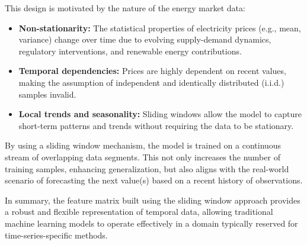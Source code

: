 \documentclass[a4paper,11pt]{article}
\begin{document}
This design is motivated by the nature of the energy market data:

\begin{itemize}
    \item \textbf{Non-stationarity:} The statistical properties of electricity prices (e.g., mean, variance) change over time due to evolving supply-demand dynamics, regulatory interventions, and renewable energy contributions.
    
    \item \textbf{Temporal dependencies:} Prices are highly dependent on recent values, making the assumption of independent and identically distributed (i.i.d.) samples invalid.
    
    \item \textbf{Local trends and seasonality:} Sliding windows allow the model to capture short-term patterns and trends without requiring the data to be stationary.
\end{itemize}

By using a sliding window mechanism, the model is trained on a continuous stream of overlapping data segments. This not only increases the number of training samples, enhancing generalization, but also aligns with the real-world scenario of forecasting the next value(s) based on a recent history of observations.

\noindent In summary, the feature matrix built using the sliding window approach provides a robust and flexible representation of temporal data, allowing traditional machine learning models to operate effectively in a domain typically reserved for time-series-specific methods.
\end{document}
